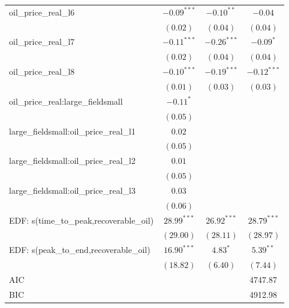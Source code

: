 \documentclass[12pt]{article}
\begin{document}
\begin{table}
\begin{center}
\begin{tabular}{l c c c }
oil_price_real_l6                    & $-0.09^{***}$   & $-0.10^{**}$   & $-0.04$         \\
                                     & $(0.02)$        & $(0.04)$       & $(0.04)$        \\
oil_price_real_l7                    & $-0.11^{***}$   & $-0.26^{***}$  & $-0.09^{*}$     \\
                                     & $(0.02)$        & $(0.04)$       & $(0.04)$        \\
oil_price_real_l8                    & $-0.10^{***}$   & $-0.19^{***}$  & $-0.12^{***}$   \\
                                     & $(0.01)$        & $(0.03)$       & $(0.03)$        \\
oil_price_real:large_fieldsmall      & $-0.11^{*}$     &                &                 \\
                                     & $(0.05)$        &                &                 \\
large_fieldsmall:oil_price_real_l1   & $0.02$          &                &                 \\
                                     & $(0.05)$        &                &                 \\
large_fieldsmall:oil_price_real_l2   & $0.01$          &                &                 \\
                                     & $(0.05)$        &                &                 \\
large_fieldsmall:oil_price_real_l3   & $0.03$          &                &                 \\
                                     & $(0.06)$        &                &                 \\
EDF: s(time_to_peak,recoverable_oil) & $28.99^{***}$   & $26.92^{***}$  & $28.79^{***}$   \\
                                     & $(29.00)$       & $(28.11)$      & $(28.97)$       \\
EDF: s(peak_to_end,recoverable_oil)  & $16.90^{***}$   & $4.83^{*}$     & $5.39^{**}$     \\
                                     & $(18.82)$       & $(6.40)$       & $(7.44)$        \\
\hline
AIC                                  &                 &                & 4747.87         \\
BIC                                  &                 &                & 4912.98         \\

\end{tabular}
\end{center}
\end{table}
\end{document}

